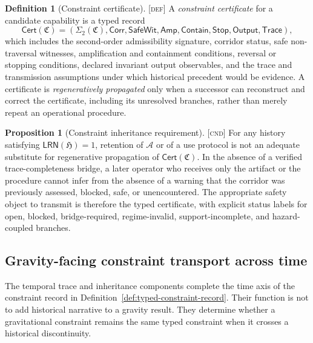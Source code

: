 \documentclass[11pt]{article}
\newcommand{\Defn}{\textsc{[def]}}
\newcommand{\Cnd}{\textsc{[cnd]}}
\theoremstyle{definition}
\newtheorem{sdefinition}{Definition}
\newtheorem{sproposition}{Proposition}
\begin{document}
\begin{sdefinition}[Constraint certificate]
\label{def:constraint-certificate}
\Defn{} A \emph{constraint certificate} for a candidate capability is a typed
record
\begin{equation}
\mathsf{Cert}(\mathfrak C)=
\left(
\Sigma_2(\mathfrak C),
\mathsf{Corr},
\mathsf{SafeWit},
\mathsf{Amp},
\mathsf{Contain},
\mathsf{Stop},
\mathsf{Output},
\mathsf{Trace}
\right),
\label{eq:constraint-certificate}
\end{equation}
which includes the second-order admissibility signature, corridor status, safe
non-traversal witnesses, amplification and containment conditions, reversal or
stopping conditions, declared invariant output observables, and the trace and
transmission assumptions under which historical precedent would be evidence.
A certificate is \emph{regeneratively propagated} only when a successor can
reconstruct and correct the certificate, including its unresolved branches, rather
than merely repeat an operational procedure.
\end{sdefinition}

\begin{sproposition}[Constraint inheritance requirement]
\label{prop:constraint-inheritance}
\Cnd{} For any history satisfying $\mathsf{LRN}(\mathfrak H)=1$, retention of
$\mathcal A$ or of a use protocol is not an adequate substitute for regenerative
propagation of $\mathsf{Cert}(\mathfrak C)$. In the absence of a verified
trace-completeness bridge, a later operator who receives only the artifact or the
procedure cannot infer from the absence of a warning that the corridor was
previously assessed, blocked, safe, or unencountered. The appropriate safety
object to transmit is therefore the typed certificate, with explicit status labels
for open, blocked, bridge-required, regime-invalid, support-incomplete, and
hazard-coupled branches.
\end{sproposition}

\subsection{Gravity-facing constraint transport across time}
\label{supp:constraint-transport-time}

The temporal trace and inheritance components complete the time axis of the
constraint record in Definition~\ref{def:typed-constraint-record}. Their function
is not to add historical narrative to a gravity result. They determine whether a
gravitational constraint remains the same typed constraint when it crosses a
historical discontinuity.
\end{document}
